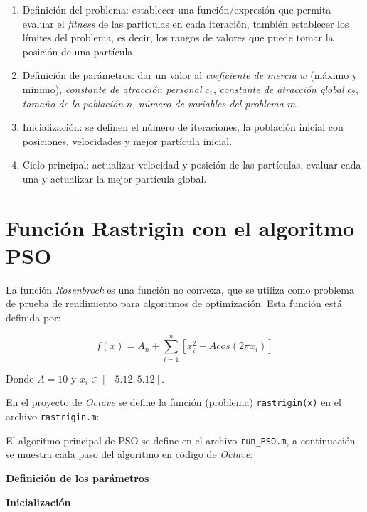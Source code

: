 \documentclass[12pt, a4paper]{article}
\begin{document}
        \begin{enumerate}
            \item Definición del problema: establecer una función/expresión que permita evaluar el \emph{fitness} de las partículas en cada iteración, también establecer los límites del problema, es decir, los rangos de valores que puede tomar la posición de una partícula.
            \item Definición de parámetros: dar un valor al \emph{coeficiente de inercia} \(w\) (máximo y mínimo), \emph{constante de atracción personal} \(c_1\), \emph{constante de atracción global} \(c_2\), \emph{tamaño de la población} \(n\), \emph{número de variables del problema} \(m\).
            \item Inicialización: se definen el número de iteraciones, la población inicial con posiciones, velocidades y mejor partícula inicial.
            \item Ciclo principal: actualizar velocidad y posición de las partículas, evaluar cada una y actualizar la mejor partícula global.
        \end{enumerate}
    
    \section{Función Rastrigin con el algoritmo PSO}
        La función \emph{Rosenbrock} es una función no convexa, que se utiliza como problema de prueba de rendimiento para algoritmos de optimización. Esta función está definida por:

        \begin{equation}
            f(x)=A_n+\sum_{i=1}^n[x_i^2-Acos(2\pi x_i)]
        \end{equation}

        Donde $A=10$ y $x_i\in [-5.12,5.12]$.
        
        En el proyecto de \emph{Octave} se define la función (problema) \lstinline{rastrigin(x)} en el archivo \lstinline{rastrigin.m}:
        
        

        El algoritmo principal de PSO se define en el archivo \lstinline{run_PSO.m}, a continuación se muestra cada paso del algoritmo en código de \emph{Octave}:

        \textbf{Definición de los parámetros}
        

        \textbf{Inicialización}
        
\end{document}
